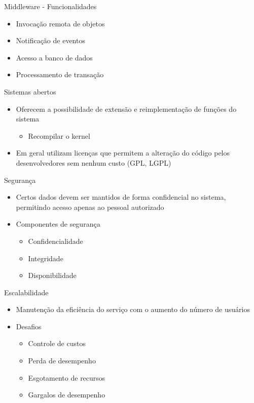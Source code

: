 \documentclass[aspectratio=169,
				xcolor=table]{beamer}
\begin{document}
	\begin{frame}{Middleware - Funcionalidades}
		\begin{itemize}
			\item Invocação remota de objetos
			\vspace{1em}
			\item Notificação de eventos
			\vspace{1em}
			\item Acesso a banco de dados
			\vspace{1em}
			\item Processamento de transação 
		\end{itemize}
	\end{frame}
	
	\begin{frame}{Sistemas abertos}
		\begin{itemize}
			\item Oferecem a possibilidade de extensão e reimplementação de funções do sistema
			\begin{itemize}
				\item Recompilar o kernel
			\end{itemize}
			\vspace{1em}
			\item Em geral utilizam licenças que permitem a alteração do código pelos desenvolvedores sem nenhum custo (GPL, LGPL)
		\end{itemize}
	\end{frame}
	
	\begin{frame}{Segurança}
		\begin{itemize}
			\item Certos dados devem ser mantidos de forma confidencial no sistema, permitindo acesso apenas ao pessoal autorizado
			\vspace{1em}
			\item Componentes de segurança
			\begin{itemize}
				\item Confidencialidade
				\item Integridade
				\item Disponibilidade
			\end{itemize}
		\end{itemize}
	\end{frame}

	\begin{frame}{Escalabilidade}
		\begin{itemize}
			\item Manutenção da eficiência do serviço com o aumento do número de usuários
			\vspace{1em}
			\item Desafios
			\begin{itemize}
				\item Controle de custos
				\item Perda de desempenho
				\item Esgotamento de recursos
				\item Gargalos de desempenho
			\end{itemize}
		\end{itemize}
	\end{frame}
	
\end{document}
